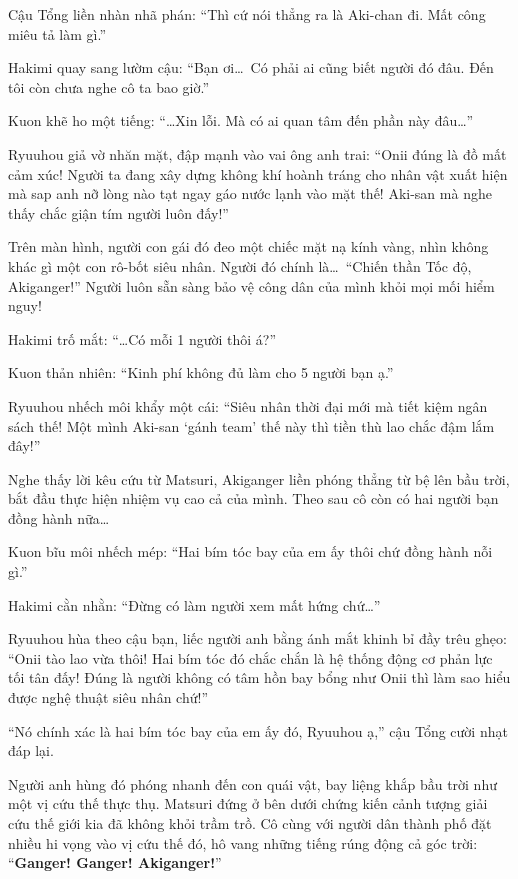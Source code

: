 \documentclass[../main.tex]{subfiles}
\begin{document}

Cậu Tổng liền nhàn nhã phán: ``Thì cứ nói thẳng ra là Aki-chan đi. Mất công miêu tả làm gì.''

Hakimi quay sang lườm cậu: ``Bạn ơi\dots\ Có phải ai cũng biết người đó đâu. Đến tôi còn chưa nghe cô ta bao giờ.''

Kuon khẽ ho một tiếng: ``\dots Xin lỗi. Mà có ai quan tâm đến phần này đâu\dots''

Ryuuhou giả vờ nhăn mặt, đập mạnh vào vai ông anh trai: ``Onii đúng là đồ mất cảm xúc! Người ta đang xây dựng không khí hoành tráng cho nhân vật xuất hiện mà sap anh nỡ lòng nào tạt ngay gáo nước lạnh vào mặt thế! Aki-san mà nghe thấy chắc giận tím người luôn đấy!''

Trên màn hình, người con gái đó đeo một chiếc mặt nạ kính vàng, nhìn không khác gì một con rô-bốt siêu nhân. Người đó chính là\dots\ ``Chiến thần Tốc độ, Akiganger!'' Người luôn sẵn sàng bảo vệ công dân của mình khỏi mọi mối hiểm nguy!

Hakimi trố mắt: ``\dots Có mỗi 1 người thôi á?''

Kuon thản nhiên: ``Kinh phí không đủ làm cho 5 người bạn ạ.''

Ryuuhou nhếch môi khẩy một cái: ``Siêu nhân thời đại mới mà tiết kiệm ngân sách thế! Một mình Aki-san `gánh team' thế này thì tiền thù lao chắc đậm lắm đây!''

Nghe thấy lời kêu cứu từ Matsuri, Akiganger liền phóng thẳng từ bệ lên bầu trời, bắt đầu thực hiện nhiệm vụ cao cả của mình. Theo sau cô còn có hai người bạn đồng hành nữa\dots


Kuon bĩu môi nhếch mép: ``Hai bím tóc bay của em ấy thôi chứ đồng hành nỗi gì.''

Hakimi cằn nhằn: ``Đừng có làm người xem mất hứng chứ\dots''

Ryuuhou hùa theo cậu bạn, liếc người anh bằng ánh mắt khinh bỉ đầy trêu ghẹo: ``Onii tào lao vừa thôi! Hai bím tóc đó chắc chắn là hệ thống động cơ phản lực tối tân đấy! Đúng là người không có tâm hồn bay bổng như Onii thì làm sao hiểu được nghệ thuật siêu nhân chứ!''

``Nó chính xác là hai bím tóc bay của em ấy đó, Ryuuhou ạ,'' cậu Tổng cười nhạt đáp lại.

Người anh hùng đó phóng nhanh đến con quái vật, bay liệng khắp bầu trời như một vị cứu thế thực thụ. Matsuri đứng ở bên dưới chứng kiến cảnh tượng giải cứu thế giới kia đã không khỏi trầm trồ. Cô cùng với người dân thành phố đặt nhiều hi vọng vào vị cứu thế đó, hô vang những tiếng rúng động cả góc trời: ``\textbf{Ganger! Ganger! Akiganger!}''
\end{document}

